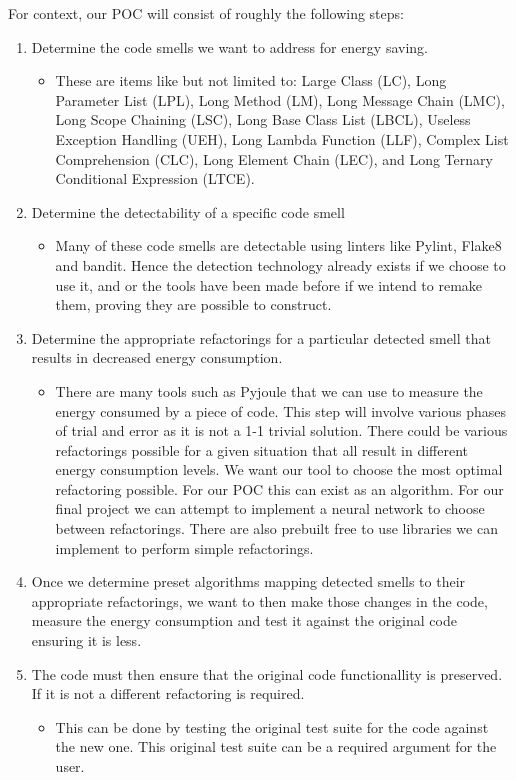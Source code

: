 \documentclass{article}
\begin{document}
For context, our POC will consist of roughly the following steps:
\begin{enumerate}
  \item Determine the code smells we want to address for energy saving.
  \begin{itemize}
    \item These are items like but not limited to: Large Class (LC), Long Parameter List (LPL), Long Method (LM), Long Message Chain (LMC), Long Scope Chaining (LSC), Long Base Class List (LBCL), Useless Exception Handling (UEH), Long Lambda Function (LLF), Complex List Comprehension (CLC), Long Element Chain (LEC), and Long Ternary Conditional Expression (LTCE).     
  \end{itemize} 
  \item Determine the detectability of a specific code smell 
  \begin{itemize}
    \item Many of these code smells are detectable using linters like Pylint, Flake8 and bandit. Hence the detection technology already exists if we choose to use it, and or the tools have been made before if we intend to remake them, proving they are possible to construct.
  \end{itemize} 
  \item Determine the appropriate refactorings for a particular detected smell that results in decreased energy consumption.
  \begin{itemize}
    \item There are many tools such as Pyjoule that we can use to measure the energy consumed by a piece of code. This step will involve various phases of trial and error as it is not a 1-1 trivial solution. There could be various refactorings possible for a given situation that all result in different energy consumption levels. We want our tool to choose the most optimal refactoring possible. For our POC this can exist as an algorithm. For our final project we can attempt to implement a neural network to choose between refactorings. There are also prebuilt free to use libraries we can implement to perform simple refactorings.
  \end{itemize} 
  \item Once we determine preset algorithms mapping detected smells to their appropriate refactorings, we want to then make those changes in the code, measure the energy consumption and test it against the original code ensuring it is less.
  \item The code must then ensure that the original code functionallity is preserved. If it is not a different refactoring is required. 
  \begin{itemize}
    \item This can be done by testing the original test suite for the code against the new one. This original test suite can be a required argument for the user.
  \end{itemize} 
\end{enumerate}
\end{document}
